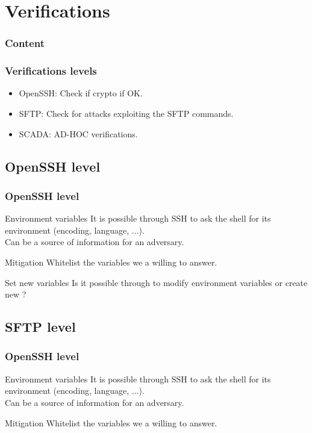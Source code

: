\documentclass{beamer}
\begin{document}
\section{Verifications}

\begin{frame}
\frametitle{Content}
\tableofcontents[currentsection]
\end{frame}



\begin{frame}
    \frametitle{Verifications levels}

    \begin{itemize}
        \item OpenSSH: Check if crypto if OK.
        \vfill
        \item SFTP: Check for attacks exploiting the SFTP commands.
        \vfill
        \item SCADA: AD-HOC verifications.
    \end{itemize}
\end{frame}

\subsection{OpenSSH level}

\begin{frame}
    \frametitle{OpenSSH level}

    \begin{block}{Environment variables}
    	It is possible through SSH to ask the shell for its environment (encoding, language, ...).\\
    	Can be a source of information for an adversary.
    \end{block}
	\vfill
	\begin{block}{Mitigation}
		Whitelist the variables we a willing to answer.
	\end{block}	
    \vfill
    \begin{block}{Set new variables}
        Is it possible through to modify environment variables or create new ?
    \end{block}
\end{frame}

\subsection{SFTP level}

\begin{frame}
    \frametitle{OpenSSH level}

    \begin{block}{Environment variables}
    	It is possible through SSH to ask the shell for its environment (encoding, language, ...).\\
    	Can be a source of information for an adversary.
    \end{block}
	\vfill
	\begin{block}{Mitigation}
		Whitelist the variables we a willing to answer.
	\end{block}	
\end{frame}
\end{document}

